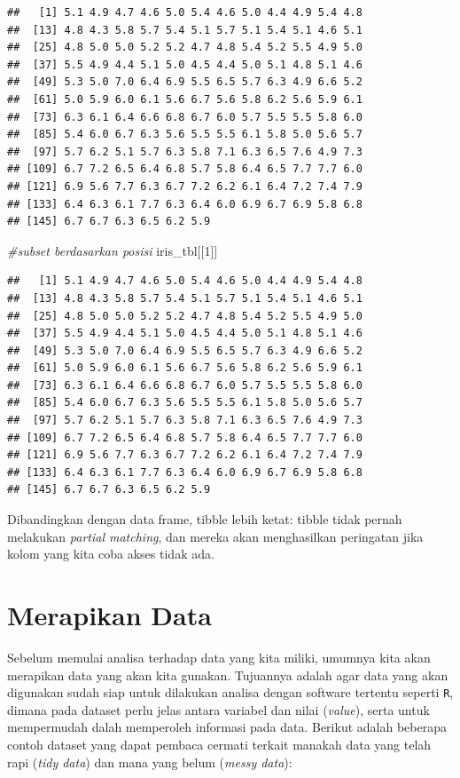 \documentclass[]{book}
\newenvironment{Shaded}{\begin{snugshade}}{\end{snugshade}}
\newcommand{\DecValTok}[1]{\textcolor[rgb]{0.00,0.00,0.81}{#1}}
\newcommand{\CommentTok}[1]{\textcolor[rgb]{0.56,0.35,0.01}{\textit{#1}}}
\newcommand{\NormalTok}[1]{#1}
\begin{document}
\begin{verbatim}
##   [1] 5.1 4.9 4.7 4.6 5.0 5.4 4.6 5.0 4.4 4.9 5.4 4.8
##  [13] 4.8 4.3 5.8 5.7 5.4 5.1 5.7 5.1 5.4 5.1 4.6 5.1
##  [25] 4.8 5.0 5.0 5.2 5.2 4.7 4.8 5.4 5.2 5.5 4.9 5.0
##  [37] 5.5 4.9 4.4 5.1 5.0 4.5 4.4 5.0 5.1 4.8 5.1 4.6
##  [49] 5.3 5.0 7.0 6.4 6.9 5.5 6.5 5.7 6.3 4.9 6.6 5.2
##  [61] 5.0 5.9 6.0 6.1 5.6 6.7 5.6 5.8 6.2 5.6 5.9 6.1
##  [73] 6.3 6.1 6.4 6.6 6.8 6.7 6.0 5.7 5.5 5.5 5.8 6.0
##  [85] 5.4 6.0 6.7 6.3 5.6 5.5 5.5 6.1 5.8 5.0 5.6 5.7
##  [97] 5.7 6.2 5.1 5.7 6.3 5.8 7.1 6.3 6.5 7.6 4.9 7.3
## [109] 6.7 7.2 6.5 6.4 6.8 5.7 5.8 6.4 6.5 7.7 7.7 6.0
## [121] 6.9 5.6 7.7 6.3 6.7 7.2 6.2 6.1 6.4 7.2 7.4 7.9
## [133] 6.4 6.3 6.1 7.7 6.3 6.4 6.0 6.9 6.7 6.9 5.8 6.8
## [145] 6.7 6.7 6.3 6.5 6.2 5.9
\end{verbatim}

\begin{Shaded}
\begin{Highlighting}[]
\CommentTok{#subset berdasarkan posisi}
\NormalTok{iris_tbl[[}\DecValTok{1}\NormalTok{]]}
\end{Highlighting}
\end{Shaded}

\begin{verbatim}
##   [1] 5.1 4.9 4.7 4.6 5.0 5.4 4.6 5.0 4.4 4.9 5.4 4.8
##  [13] 4.8 4.3 5.8 5.7 5.4 5.1 5.7 5.1 5.4 5.1 4.6 5.1
##  [25] 4.8 5.0 5.0 5.2 5.2 4.7 4.8 5.4 5.2 5.5 4.9 5.0
##  [37] 5.5 4.9 4.4 5.1 5.0 4.5 4.4 5.0 5.1 4.8 5.1 4.6
##  [49] 5.3 5.0 7.0 6.4 6.9 5.5 6.5 5.7 6.3 4.9 6.6 5.2
##  [61] 5.0 5.9 6.0 6.1 5.6 6.7 5.6 5.8 6.2 5.6 5.9 6.1
##  [73] 6.3 6.1 6.4 6.6 6.8 6.7 6.0 5.7 5.5 5.5 5.8 6.0
##  [85] 5.4 6.0 6.7 6.3 5.6 5.5 5.5 6.1 5.8 5.0 5.6 5.7
##  [97] 5.7 6.2 5.1 5.7 6.3 5.8 7.1 6.3 6.5 7.6 4.9 7.3
## [109] 6.7 7.2 6.5 6.4 6.8 5.7 5.8 6.4 6.5 7.7 7.7 6.0
## [121] 6.9 5.6 7.7 6.3 6.7 7.2 6.2 6.1 6.4 7.2 7.4 7.9
## [133] 6.4 6.3 6.1 7.7 6.3 6.4 6.0 6.9 6.7 6.9 5.8 6.8
## [145] 6.7 6.7 6.3 6.5 6.2 5.9
\end{verbatim}

Dibandingkan dengan data frame, tibble lebih ketat: tibble tidak pernah
melakukan \emph{partial matching}, dan mereka akan menghasilkan
peringatan jika kolom yang kita coba akses tidak ada.

\section{Merapikan Data}\label{merapikan-data}

Sebelum memulai analisa terhadap data yang kita miliki, umumnya kita
akan merapikan data yang akan kita gunakan. Tujuannya adalah agar data
yang akan digunakan sudah siap untuk dilakukan analisa dengan software
tertentu seperti \texttt{R}, dimana pada dataset perlu jelas antara
variabel dan nilai (\emph{value}), serta untuk mempermudah dalah
memperoleh informasi pada data. Berikut adalah beberapa contoh dataset
yang dapat pembaca cermati terkait manakah data yang telah rapi
(\emph{tidy data}) dan mana yang belum (\emph{messy data}):
\end{document}
